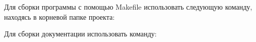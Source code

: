 Для сборки программы с помощью Makefile использовать следующую команду, находясь в корневой папке проекта\+: 
\begin{DoxyCode}{0}

\end{DoxyCode}
 Для сборки документации использовать команду\+: 
\begin{DoxyCode}{0}

\end{DoxyCode}
 